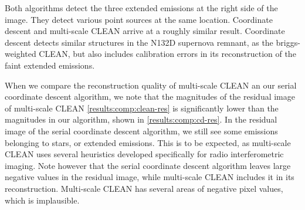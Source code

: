 Both algorithms detect the three extended emissions at the right side of the image. They detect various point sources at the same location. Coordinate descent and multi-scale CLEAN arrive at a roughly similar result. Coordinate descent detects similar structures in the N132D supernova remnant, as the briggs-weighted CLEAN, but also includes calibration errors in its reconstruction of the faint extended emissions.

When we compare the reconstruction quality of multi-scale CLEAN an our serial coordinate descent algorithm, we note that the magnitudes of the residual image of multi-scale CLEAN \ref{results:comp:clean-res} is significantly lower than the magnitudes in our algorithm, shown in \ref{results:comp:cd-res}. In the residual image of the serial coordinate descent algorithm, we still see some emissions belonging to stars, or extended emissions. This is to be expected, as multi-scale CLEAN uses several heuristics developed specifically for radio interferometric imaging\cite{offringa2017optimized}. 
Note however that the serial coordinate descent algorithm leaves large negative values in the residual image, while multi-scale CLEAN includes it in its reconstruction. Multi-scale CLEAN has several areas of negative pixel values, which is implausible.



